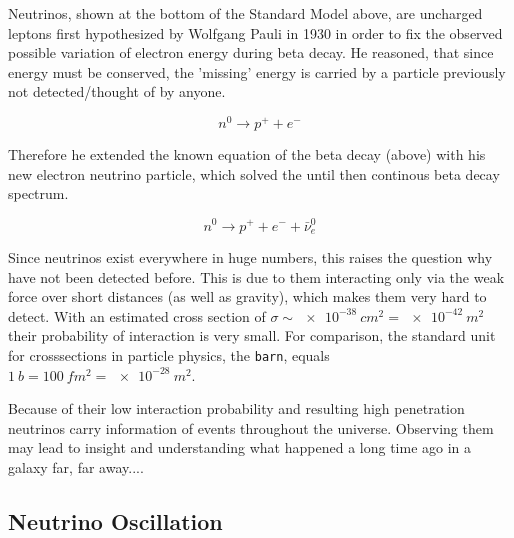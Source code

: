 \documentclass[a4paper,10pt]{scrartcl}
\begin{document}
\label{neutrinos}

Neutrinos, shown at the bottom of the Standard Model above, are uncharged leptons first hypothesized by Wolfgang Pauli in 1930 in order to fix the observed possible variation of electron energy during beta decay.
He reasoned, that since energy must be conserved, the 'missing' energy is carried by a particle previously not detected/thought of by anyone.

\begin{equation}
    n^0 \longrightarrow p^+ + e^-
\end{equation}

Therefore he extended the known equation of the beta decay (above) with his new electron neutrino particle, which solved the until then continous beta decay spectrum.

\begin{equation}
    n^0 \longrightarrow p^+ + e^- + \bar{\nu}_e^0
\end{equation}

Since neutrinos exist everywhere in huge numbers, this raises the question why have not been detected before.
This is due to them interacting only via the weak force over short distances (as well as gravity), which makes them very hard to detect.
With an estimated cross section of $\sigma \sim \SI{e-38}{cm^2} = \SI{e-42}{m^2}$ their probability of interaction is very small.
For comparison, the standard unit for crosssections in particle physics, the \texttt{barn}, equals $\SI{1}{b} = \SI{100}{fm^2} = \SI{e-28}{m^2}$.



Because of their low interaction probability and resulting high penetration neutrinos carry information of events throughout the universe.
Observing them may lead to insight and understanding what happened a long time ago in a galaxy far, far away....

\subsection{Neutrino Oscillation}
\end{document}
